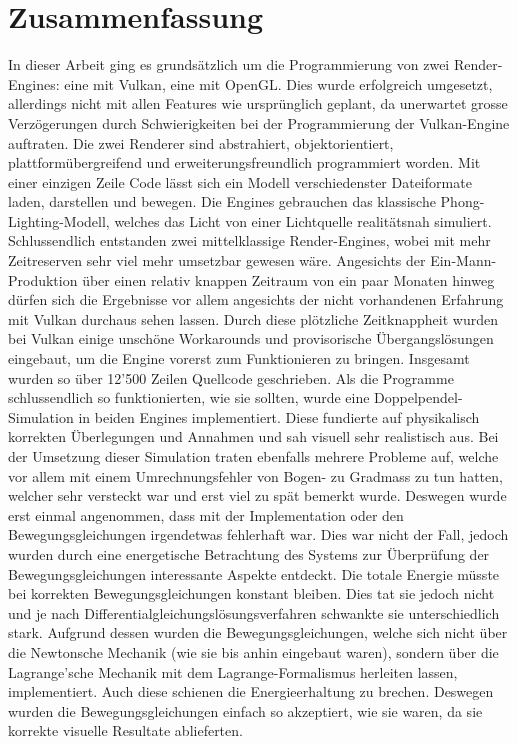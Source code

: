\documentclass[titlepage, 11pt, a4paper, ngerman]{article}
\begin{document}
\section{Zusammenfassung}
In dieser Arbeit ging es grundsätzlich um die Programmierung von zwei Render-Engines: eine mit Vulkan, eine mit OpenGL. Dies wurde erfolgreich umgesetzt, allerdings nicht mit allen Features wie ursprünglich geplant, da unerwartet grosse Verzögerungen durch Schwierigkeiten bei der Programmierung der Vulkan-Engine auftraten. Die zwei Renderer sind abstrahiert, objektorientiert, plattformübergreifend und erweiterungsfreundlich programmiert worden. Mit einer einzigen Zeile Code lässt sich ein Modell verschiedenster Dateiformate laden, darstellen und bewegen. Die Engines gebrauchen das klassische Phong-Lighting-Modell, welches das Licht von einer Lichtquelle realitätsnah simuliert. Schlussendlich entstanden zwei mittelklassige Render-Engines, wobei mit mehr Zeitreserven sehr viel mehr umsetzbar gewesen wäre. Angesichts der Ein-Mann-Produktion über einen relativ knappen Zeitraum von ein paar Monaten hinweg dürfen sich die Ergebnisse vor allem angesichts der nicht vorhandenen Erfahrung mit Vulkan durchaus sehen lassen. Durch diese plötzliche Zeitknappheit wurden bei Vulkan einige unschöne Workarounds und provisorische Übergangslösungen eingebaut, um die Engine vorerst zum Funktionieren zu bringen. Insgesamt wurden so über 12'500 Zeilen Quellcode geschrieben. Als die Programme schlussendlich so funktionierten, wie sie sollten, wurde eine Doppelpendel-Simulation in beiden Engines implementiert. Diese fundierte auf physikalisch korrekten Überlegungen und Annahmen und sah visuell sehr realistisch aus. Bei der Umsetzung dieser Simulation traten ebenfalls mehrere Probleme auf, welche vor allem mit einem Umrechnungsfehler von Bogen- zu Gradmass zu tun hatten, welcher sehr versteckt war und erst viel zu spät bemerkt wurde. Deswegen wurde erst einmal angenommen, dass mit der Implementation oder den Bewegungsgleichungen irgendetwas fehlerhaft war. Dies war nicht der Fall, jedoch wurden durch eine energetische Betrachtung des Systems zur Überprüfung der Bewegungsgleichungen interessante Aspekte entdeckt. Die totale Energie müsste bei korrekten Bewegungsgleichungen konstant bleiben. Dies tat sie jedoch nicht und je nach Differentialgleichungslösungsverfahren schwankte sie unterschiedlich stark. Aufgrund dessen wurden die Bewegungsgleichungen, welche sich nicht über die Newtonsche Mechanik (wie sie bis anhin eingebaut waren), sondern über die Lagrange'sche Mechanik mit dem Lagrange-Formalismus herleiten lassen, implementiert. Auch diese schienen die Energieerhaltung zu brechen. Deswegen wurden die Bewegungsgleichungen einfach so akzeptiert, wie sie waren, da sie korrekte visuelle Resultate ablieferten. \par
\end{document}
